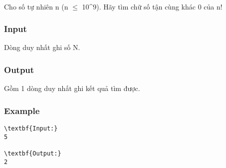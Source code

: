 

 

Cho số tự nhiên n (n  $\le$  10^9). Hãy tìm chữ số tận cùng khác 0 của n!

\subsubsection{Input}

Dòng duy nhất ghi số N.

\subsubsection{Output}

Gồm 1 dòng duy nhất ghi kết quả tìm được.

\subsubsection{Example}
\begin{verbatim}
\textbf{Input:}
5

\textbf{Output:}
2
\end{verbatim}
